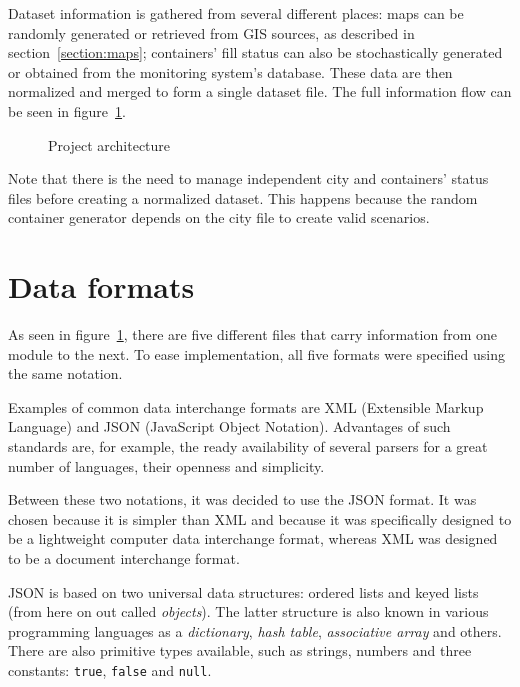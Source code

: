 Dataset information is gathered from several different places: maps can be
randomly generated or retrieved from GIS sources, as described in
section~\ref{section:maps}; containers' fill status can also be stochastically
generated or obtained from the monitoring system's database. These data are
then normalized and merged to form a single dataset file. The full information
flow can be seen in figure~\ref{fig:architecture}.

\begin{figure}[th]
  \begin{center}
    \leavevmode
    
    \caption{Project architecture}
    \label{fig:architecture}
  \end{center}
\end{figure}

Note that there is the need to manage independent city and containers' status
files before creating a normalized dataset. This happens because the random
container generator depends on the city file to create valid scenarios.





\newpage
\section{Data formats}
\label{section:formats}

As seen in figure~\ref{fig:architecture}, there are five different files that
carry information from one module to the next. To ease implementation, all five
formats were specified using the same notation.

Examples of common data interchange formats are XML (Extensible Markup
Language) and JSON (JavaScript Object Notation). Advantages of such standards
are, for example, the ready availability of several parsers for a great number
of languages\citep{site:json}\cite{site:xml}, their openness and simplicity.

Between these two notations, it was decided to use the JSON format. It was
chosen because it is simpler than XML and because it was specifically designed
to be a lightweight computer data interchange format, whereas XML was designed
to be a document interchange format\citep{site:json}.

JSON is based on two universal data structures: ordered lists and keyed lists
(from here on out called \textit{objects}).  The latter structure is also known
in various programming languages as a \textit{dictionary}, \textit{hash table},
\textit{associative array} and others. There are also primitive types
available, such as strings, numbers and three constants: \texttt{true},
\texttt{false} and \texttt{null}.

